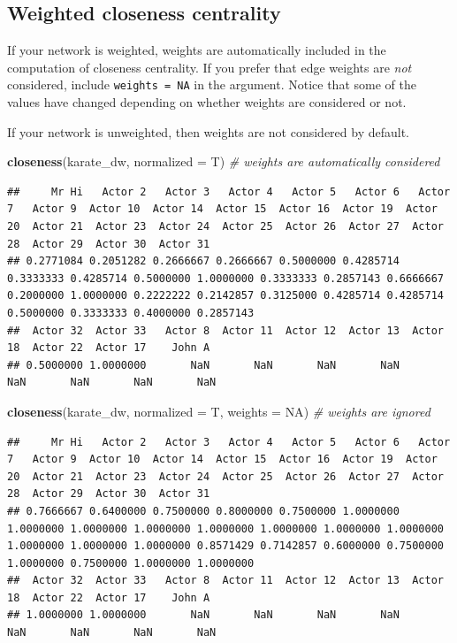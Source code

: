 \documentclass[
]{book}
\newenvironment{Shaded}{\begin{snugshade}}{\end{snugshade}}
\newcommand{\AttributeTok}[1]{\textcolor[rgb]{0.13,0.29,0.53}{#1}}
\newcommand{\CommentTok}[1]{\textcolor[rgb]{0.56,0.35,0.01}{\textit{#1}}}
\newcommand{\ConstantTok}[1]{\textcolor[rgb]{0.56,0.35,0.01}{#1}}
\newcommand{\FunctionTok}[1]{\textcolor[rgb]{0.13,0.29,0.53}{\textbf{#1}}}
\newcommand{\NormalTok}[1]{#1}
\begin{document}
\subsection{Weighted closeness centrality}\label{weighted-closeness-centrality}

If your network is weighted, weights are automatically included in the computation of closeness centrality. If you prefer that edge weights are \emph{not} considered, include \texttt{weights\ =\ NA} in the argument. Notice that some of the values have changed depending on whether weights are considered or not.

If your network is unweighted, then weights are not considered by default.

\begin{Shaded}
\begin{Highlighting}[]
\FunctionTok{closeness}\NormalTok{(karate\_dw, }\AttributeTok{normalized =}\NormalTok{ T) }\CommentTok{\# weights are automatically considered}
\end{Highlighting}
\end{Shaded}

\begin{verbatim}
##     Mr Hi   Actor 2   Actor 3   Actor 4   Actor 5   Actor 6   Actor 7   Actor 9  Actor 10  Actor 14  Actor 15  Actor 16  Actor 19  Actor 20  Actor 21  Actor 23  Actor 24  Actor 25  Actor 26  Actor 27  Actor 28  Actor 29  Actor 30  Actor 31 
## 0.2771084 0.2051282 0.2666667 0.2666667 0.5000000 0.4285714 0.3333333 0.4285714 0.5000000 1.0000000 0.3333333 0.2857143 0.6666667 0.2000000 1.0000000 0.2222222 0.2142857 0.3125000 0.4285714 0.4285714 0.5000000 0.3333333 0.4000000 0.2857143 
##  Actor 32  Actor 33   Actor 8  Actor 11  Actor 12  Actor 13  Actor 18  Actor 22  Actor 17    John A 
## 0.5000000 1.0000000       NaN       NaN       NaN       NaN       NaN       NaN       NaN       NaN
\end{verbatim}

\begin{Shaded}
\begin{Highlighting}[]
\FunctionTok{closeness}\NormalTok{(karate\_dw, }\AttributeTok{normalized =}\NormalTok{ T, }\AttributeTok{weights =} \ConstantTok{NA}\NormalTok{) }\CommentTok{\# weights are ignored}
\end{Highlighting}
\end{Shaded}

\begin{verbatim}
##     Mr Hi   Actor 2   Actor 3   Actor 4   Actor 5   Actor 6   Actor 7   Actor 9  Actor 10  Actor 14  Actor 15  Actor 16  Actor 19  Actor 20  Actor 21  Actor 23  Actor 24  Actor 25  Actor 26  Actor 27  Actor 28  Actor 29  Actor 30  Actor 31 
## 0.7666667 0.6400000 0.7500000 0.8000000 0.7500000 1.0000000 1.0000000 1.0000000 1.0000000 1.0000000 1.0000000 1.0000000 1.0000000 1.0000000 1.0000000 1.0000000 0.8571429 0.7142857 0.6000000 0.7500000 1.0000000 0.7500000 1.0000000 1.0000000 
##  Actor 32  Actor 33   Actor 8  Actor 11  Actor 12  Actor 13  Actor 18  Actor 22  Actor 17    John A 
## 1.0000000 1.0000000       NaN       NaN       NaN       NaN       NaN       NaN       NaN       NaN
\end{verbatim}
\end{document}
